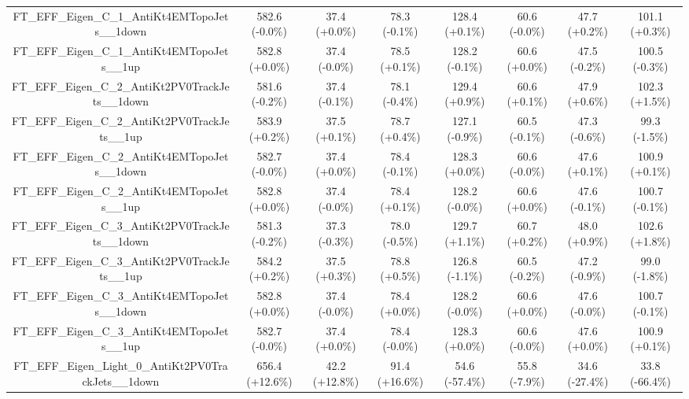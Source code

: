 \begin{table}[htbp!]
\begin{tiny}
\begin{center}
\begin{tabular}{c|c|c|c||c|c|c|c}
FT\_EFF\_Eigen\_C\_1\_AntiKt4EMTopoJets\_\_1down             & 582.6     (-0.0\%) & 37.4      (+0.0\%) & 78.3      (-0.1\%) & 128.4     (+0.1\%) & 60.6      (-0.0\%) & 47.7      (+0.2\%) & 101.1     (+0.3\%) \\ 
FT\_EFF\_Eigen\_C\_1\_AntiKt4EMTopoJets\_\_1up               & 582.8     (+0.0\%) & 37.4      (-0.0\%) & 78.5      (+0.1\%) & 128.2     (-0.1\%) & 60.6      (+0.0\%) & 47.5      (-0.2\%) & 100.5     (-0.3\%) \\ 
FT\_EFF\_Eigen\_C\_2\_AntiKt2PV0TrackJets\_\_1down           & 581.6     (-0.2\%) & 37.4      (-0.1\%) & 78.1      (-0.4\%) & 129.4     (+0.9\%) & 60.6      (+0.1\%) & 47.9      (+0.6\%) & 102.3     (+1.5\%) \\ 
FT\_EFF\_Eigen\_C\_2\_AntiKt2PV0TrackJets\_\_1up             & 583.9     (+0.2\%) & 37.5      (+0.1\%) & 78.7      (+0.4\%) & 127.1     (-0.9\%) & 60.5      (-0.1\%) & 47.3      (-0.6\%) & 99.3      (-1.5\%) \\ 
FT\_EFF\_Eigen\_C\_2\_AntiKt4EMTopoJets\_\_1down             & 582.7     (-0.0\%) & 37.4      (+0.0\%) & 78.4      (-0.1\%) & 128.3     (+0.0\%) & 60.6      (-0.0\%) & 47.6      (+0.1\%) & 100.9     (+0.1\%) \\ 
FT\_EFF\_Eigen\_C\_2\_AntiKt4EMTopoJets\_\_1up               & 582.8     (+0.0\%) & 37.4      (-0.0\%) & 78.4      (+0.1\%) & 128.2     (-0.0\%) & 60.6      (+0.0\%) & 47.6      (-0.1\%) & 100.7     (-0.1\%) \\ 
FT\_EFF\_Eigen\_C\_3\_AntiKt2PV0TrackJets\_\_1down           & 581.3     (-0.2\%) & 37.3      (-0.3\%) & 78.0      (-0.5\%) & 129.7     (+1.1\%) & 60.7      (+0.2\%) & 48.0      (+0.9\%) & 102.6     (+1.8\%) \\ 
FT\_EFF\_Eigen\_C\_3\_AntiKt2PV0TrackJets\_\_1up             & 584.2     (+0.2\%) & 37.5      (+0.3\%) & 78.8      (+0.5\%) & 126.8     (-1.1\%) & 60.5      (-0.2\%) & 47.2      (-0.9\%) & 99.0      (-1.8\%) \\ 
FT\_EFF\_Eigen\_C\_3\_AntiKt4EMTopoJets\_\_1down             & 582.8     (+0.0\%) & 37.4      (-0.0\%) & 78.4      (+0.0\%) & 128.2     (-0.0\%) & 60.6      (+0.0\%) & 47.6      (-0.0\%) & 100.7     (-0.1\%) \\ 
FT\_EFF\_Eigen\_C\_3\_AntiKt4EMTopoJets\_\_1up               & 582.7     (-0.0\%) & 37.4      (+0.0\%) & 78.4      (-0.0\%) & 128.3     (+0.0\%) & 60.6      (-0.0\%) & 47.6      (+0.0\%) & 100.9     (+0.1\%) \\ 
FT\_EFF\_Eigen\_Light\_0\_AntiKt2PV0TrackJets\_\_1down       & 656.4     (+12.6\%) & 42.2      (+12.8\%) & 91.4      (+16.6\%) & 54.6      (-57.4\%) & 55.8      (-7.9\%) & 34.6      (-27.4\%) & 33.8      (-66.4\%) \\ 

\end{tabular}
\end{center}
\end{tiny}
\end{table}
